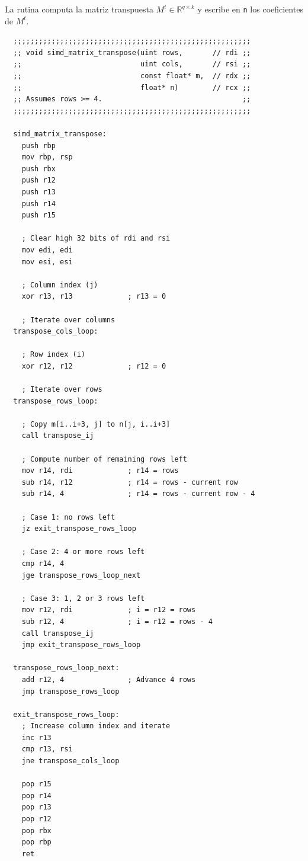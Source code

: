 \documentclass[a4paper, 10pt, twoside]{article}
\newcommand{\cc}[1]{\texttt{#1}}
\begin{document}
La rutina computa la matriz transpuesta $M^t \in \mathbb{R}^{q \times k}$ y
escribe en \cc{n} los coeficientes de $M^t$.

\begin{verbatim}
  ;;;;;;;;;;;;;;;;;;;;;;;;;;;;;;;;;;;;;;;;;;;;;;;;;;;;;;;;
  ;; void simd_matrix_transpose(uint rows,       // rdi ;;
  ;;                            uint cols,       // rsi ;;
  ;;                            const float* m,  // rdx ;;
  ;;                            float* n)        // rcx ;;
  ;; Assumes rows >= 4.                                 ;;
  ;;;;;;;;;;;;;;;;;;;;;;;;;;;;;;;;;;;;;;;;;;;;;;;;;;;;;;;;

  simd_matrix_transpose:
    push rbp
    mov rbp, rsp
    push rbx
    push r12
    push r13
    push r14
    push r15

    ; Clear high 32 bits of rdi and rsi
    mov edi, edi
    mov esi, esi

    ; Column index (j)
    xor r13, r13             ; r13 = 0

    ; Iterate over columns
  transpose_cols_loop:

    ; Row index (i)
    xor r12, r12             ; r12 = 0

    ; Iterate over rows
  transpose_rows_loop:

    ; Copy m[i..i+3, j] to n[j, i..i+3]
    call transpose_ij

    ; Compute number of remaining rows left
    mov r14, rdi             ; r14 = rows
    sub r14, r12             ; r14 = rows - current row
    sub r14, 4               ; r14 = rows - current row - 4

    ; Case 1: no rows left
    jz exit_transpose_rows_loop

    ; Case 2: 4 or more rows left
    cmp r14, 4
    jge transpose_rows_loop_next

    ; Case 3: 1, 2 or 3 rows left
    mov r12, rdi             ; i = r12 = rows
    sub r12, 4               ; i = r12 = rows - 4
    call transpose_ij
    jmp exit_transpose_rows_loop

  transpose_rows_loop_next:
    add r12, 4               ; Advance 4 rows
    jmp transpose_rows_loop

  exit_transpose_rows_loop:
    ; Increase column index and iterate
    inc r13
    cmp r13, rsi
    jne transpose_cols_loop

    pop r15
    pop r14
    pop r13
    pop r12
    pop rbx
    pop rbp
    ret
\end{verbatim}
\end{document}
